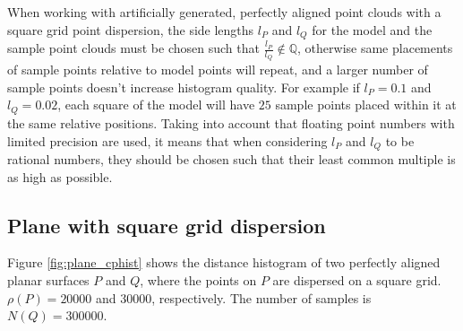 When working with artificially generated, perfectly aligned point clouds with a square grid point dispersion, the side lengths $l_P$ and $l_Q$ for the model and the sample point clouds must be chosen such that $\frac{l_P}{l_Q} \notin \mathbb{Q}$, otherwise same placements of sample points relative to model points will repeat, and a larger number of sample points doesn't increase histogram quality. For example if $l_P = 0.1$ and $l_Q = 0.02$, each square of the model will have $25$ sample points placed within it at the same relative positions. Taking into account that floating point numbers with limited precision are used, it means that when considering $l_P$ and $l_Q$ to be rational numbers, they should be chosen such that their least common multiple is as high as possible.


\subsection{Plane with square grid dispersion}
Figure \ref{fig:plane_cphist} shows the distance histogram of two perfectly aligned planar surfaces $P$ and $Q$, where the points on $P$ are dispersed on a square grid. $\rho(P) = 20000$ and $30000$, respectively. The number of samples is $N(Q) = 300000$.

